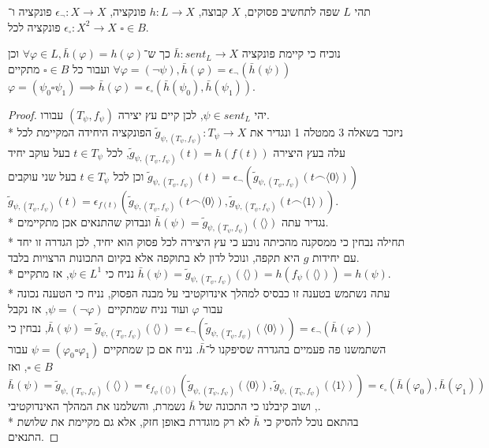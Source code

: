 \Question{}
תהי $L$ שפה לתחשיב פסוקים, $X$ קבוצה, $h : L \to X$ פונקציה, $\epsilon_\lnot : X \to X$ פונקציה ו־$\epsilon_\square : X^2 \to X$ פונקציה לכל $\square \in B$.

\Subquestion{}
נוכיח כי קיימת פונקציה $\bar{h} : sent_L \to X$ כך ש־$\forall \varphi \in L, \bar{h}(\varphi) = h(\varphi)$ וכן $\forall \varphi = (\lnot \psi), \bar{h}(\varphi) = \epsilon_\lnot(\bar{h}(\psi))$
ועבור כל $\square \in B$ מתקיים $\varphi = (\psi_0 \square \psi_1) \implies \bar{h}(\varphi) = \epsilon_\square(\bar{h}(\psi_0), \bar{h}(\psi_1))$.
\begin{proof}
	יהי $\psi \in sent_L$, לכן קיים עץ יצירה $(T_\psi, f_\psi)$ עבורו. \\*
	ניזכר בשאלה 3 ממטלה 1 ונגדיר את $\tilde{g}_{\psi, (T_\psi, f_\psi)} : T_\psi \to X$ הפונקציה היחידה המקיימת לכל עלה בעץ היצירה $\tilde{g}_{\psi, (T_\psi, f_\psi)}(t) = h(f(t))$,
	לכל $t \in T_\psi$ בעל עוקב יחיד $\tilde{g}_{\psi, (T_\psi, f_\psi)}(t) = \epsilon_\lnot(\tilde{g}_{\psi, (T_\psi, f_\psi)}(t \frown \langle 0 \rangle))$
	וכן לכל $t \in T_\psi$ בעל שני עוקבים $\tilde{g}_{\psi, (T_\psi, f_\psi)}(t) = \epsilon_{f(t)}(\tilde{g}_{\psi, (T_\psi, f_\psi)}(t \frown \langle 0 \rangle), \tilde{g}_{\psi, (T_\psi, f_\psi)}(t \frown \langle 1 \rangle))$. \\*
	נגדיר עתה $\bar{h}(\psi) = \tilde{g}_{\psi, (T_\psi, f_\psi)}(\langle \rangle)$ ונבדוק שהתנאים אכן מתקיימים. \\*
	תחילה נבחין כי ממסקנה מהכיתה נובע כי עץ היצירה לכל פסוק הוא יחיד, לכן הגדרה זו יחד עם יחידות $g$ היא תקפה, ונוכל לדון לא בתוקפה אלא בקיום התכונות הרצויות בלבד. \\*
	נניח כי $\psi \in L^1$, אז מתקיים $\bar{h}(\psi) = \tilde{g}_{\psi, (T_\psi, f_\psi)}(\langle \rangle) = h(f_\psi(\langle \rangle)) = h(\psi)$. \\*
	עתה נשתמש בטענה זו כבסיס למהלך אינדוקטיבי על מבנה הפסוק, נניח כי הטענה נכונה עבור $\varphi$ ועוד נניח שמתקיים $\psi = (\lnot \varphi)$,
	אז נקבל $\bar{h}(\psi) = \tilde{g}_{\psi, (T_\psi, f_\psi)}(\langle \rangle) = \epsilon_\lnot(\tilde{g}_{\psi, (T_\psi, f_\psi)}(\langle 0 \rangle)) = \epsilon_\lnot(\bar{h}(\varphi))$,
	נבחין כי השתמשנו פה פעמיים בהגדרה שסיפקנו ל־$\bar{h}$.
	נניח אם כן שמתקיים $\psi = (\varphi_0 \square \varphi_1)$ עבור $\square \in B$,
	ואז $\bar{h}(\psi) = \tilde{g}_{\psi, (T_\psi, f_\psi)}(\langle \rangle) = \epsilon_{f_\psi(\langle \rangle)}(\tilde{g}_{\psi, (T_\psi, f_\psi)}(\langle 0 \rangle), \tilde{g}_{\psi, (T_\psi, f_\psi)}(\langle 1 \rangle))
	= \epsilon_\square(\bar{h}(\varphi_0), \bar{h}(\varphi_1))$, ושוב קיבלנו כי התכונה של $\bar{h}$ נשמרת, והשלמנו את המהלך האינדוקטיבי. \\*
	בהתאם נוכל להסיק כי $\bar{h}$ לא רק מוגדרת באופן חזק, אלא גם מקיימת את שלושת התנאים.
\end{proof}


